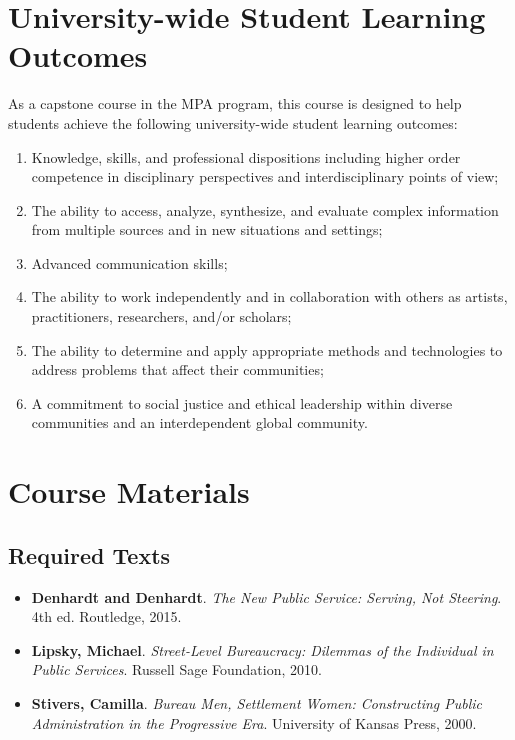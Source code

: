 \documentclass[12pt, letterpaper]{article}
\begin{document}
\section{University-wide Student Learning Outcomes}
    As a capstone course in the MPA program, this course is designed to help students achieve the following university-wide student learning outcomes:
    \begin{enumerate}
        \item Knowledge, skills, and professional dispositions including higher order competence in disciplinary perspectives and interdisciplinary points of view;
        \item The ability to access, analyze, synthesize, and evaluate complex information from multiple sources and in new situations and settings;
        \item Advanced communication skills;
        \item The ability to work independently and in collaboration with others as artists, practitioners, researchers, and/or scholars;
        \item The ability to determine and apply appropriate methods and technologies to address problems that affect their communities; 
        \item A commitment to social justice and ethical leadership within diverse communities and an interdependent global community.
    \end{enumerate}

    \section{Course Materials}
    \subsection*{Required Texts}
    \begin{itemize}
        \item \textbf{Denhardt and Denhardt}. \textit{The New Public Service: Serving, Not Steering}. 4th ed. Routledge, 2015.
        \item \textbf{Lipsky, Michael}. \textit{Street-Level Bureaucracy: Dilemmas of the Individual in Public Services}. Russell Sage Foundation, 2010.
        \item \textbf{Stivers, Camilla}. \textit{Bureau Men, Settlement Women: Constructing Public Administration in the Progressive Era}. University of Kansas Press, 2000.
    \end{itemize}
\end{document}
